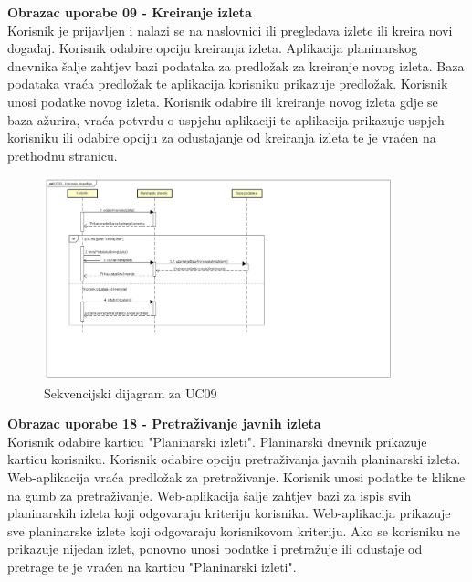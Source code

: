 				\textbf{ Obrazac uporabe 09 - Kreiranje izleta}\\
		
Korisnik je prijavljen i nalazi se na naslovnici ili pregledava izlete ili kreira novi događaj. Korisnik odabire opciju kreiranja izleta. Aplikacija planinarskog dnevnika šalje zahtjev bazi podataka za predložak za kreiranje novog izleta. Baza podataka vraća predložak te aplikacija korisniku prikazuje predložak. Korisnik unosi podatke novog izleta. Korisnik odabire ili kreiranje novog izleta gdje se baza ažurira, vraća potvrdu o uspjehu aplikaciji te aplikacija prikazuje uspjeh korisniku ili odabire opciju za odustajanje od kreiranja izleta te je vraćen na prethodnu stranicu.

		
		
		
				\begin{figure}[H]
					\centering
						\includegraphics[width=0.9\textwidth]{slike/UC09-Kreiranje_izleta.jpg}
					\caption{Sekvencijski dijagram za UC09}
						\label{fig:mesh5}
				\end{figure}
				
\newpage
			
				\textbf{ Obrazac uporabe 18 - Pretraživanje javnih izleta}\\
				
Korisnik odabire karticu "Planinarski izleti". Planinarski dnevnik prikazuje karticu korisniku. Korisnik odabire opciju pretraživanja javnih planinarski izleta. Web-aplikacija vraća predložak za pretraživanje. Korisnik unosi podatke te klikne na gumb za pretraživanje. Web-aplikacija šalje zahtjev bazi za ispis svih planinarskih izleta koji odgovaraju kriteriju korisnika. Web-aplikacija prikazuje sve planinarske izlete koji odgovaraju korisnikovom kriteriju. Ako se korisniku ne prikazuje nijedan izlet, ponovno unosi podatke i pretražuje ili odustaje od pretrage te je vraćen na karticu "Planinarski izleti".
				
